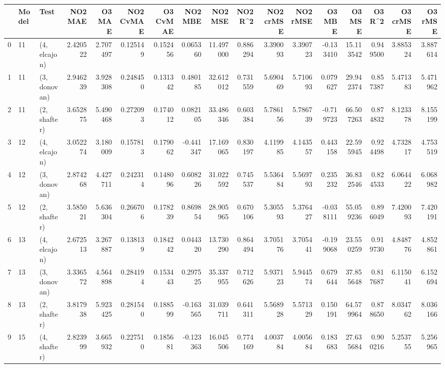 \begin{tabular}{lllrrrrrrrrrrrrrr}
\toprule
{} & Model &          Test &   NO2 MAE &    O3 MAE &  NO2 CvMAE &  O3 CvMAE &   NO2 MBE &    NO2 MSE &   NO2 R\textasciicircum2 &  NO2 crMSE &  NO2 rMSE &    O3 MBE &      O3 MSE &    O3 R\textasciicircum2 &  O3 crMSE &    O3 rMSE \\
\midrule
0  &    11 &  (4, elcajon) &  2.420522 &  2.707497 &   0.125149 &  0.152456 &  0.065360 &  11.497000 &  0.886294 &   3.390093 &  3.390723 & -0.133410 &   15.113542 &  0.949500 &  3.885324 &   3.887614 \\
1  &    11 &  (3, donovan) &  2.946239 &  3.928308 &   0.248450 &  0.131342 &  0.480185 &  32.612012 &  0.731559 &   5.690469 &  5.710693 &  0.079627 &   29.942374 &  0.857387 &  5.471383 &   5.471962 \\
2  &    11 &  (2, shafter) &  3.652875 &  5.490468 &   0.272093 &  0.174012 &  0.082105 &  33.486346 &  0.603384 &   5.786156 &  5.786739 & -0.719723 &   66.507263 &  0.874832 &  8.123378 &   8.155199 \\
3  &    12 &  (4, elcajon) &  3.052274 &  3.180009 &   0.157813 &  0.179062 & -0.441347 &  17.169065 &  0.830197 &   4.119985 &  4.143557 &  0.443158 &   22.595945 &  0.924498 &  4.732817 &   4.753519 \\
4  &    12 &  (3, donovan) &  2.874268 &  4.427711 &   0.242314 &  0.148096 &  0.608226 &  31.022592 &  0.745537 &   5.536484 &  5.569793 &  0.235232 &   36.832546 &  0.824533 &  6.064422 &   6.068982 \\
5  &    12 &  (2, shafter) &  3.585021 &  5.636304 &   0.266706 &  0.178239 &  0.869854 &  28.905965 &  0.670106 &   5.305593 &  5.376427 & -0.038111 &   55.059236 &  0.896049 &  7.420093 &   7.420191 \\
6  &    13 &  (4, elcajon) &  2.672513 &  3.267887 &   0.138139 &  0.184242 &  0.044320 &  13.730290 &  0.864494 &   3.705176 &  3.705441 & -0.199068 &   23.550259 &  0.919730 &  4.848776 &   4.852861 \\
7  &    13 &  (3, donovan) &  3.336572 &  4.564898 &   0.284194 &  0.153443 &  0.297525 &  35.337955 &  0.712626 &   5.937123 &  5.944574 &  0.679644 &   37.855648 &  0.817687 &  6.115041 &   6.152694 \\
8  &    13 &  (2, shafter) &  3.817938 &  5.923425 &   0.281540 &  0.188599 & -0.163565 &  31.039711 &  0.641311 &   5.568928 &  5.571329 &  0.150191 &   64.579964 &  0.878650 &  8.034762 &   8.036166 \\
9  &    15 &  (4, shafter) &  2.823999 &  3.665932 &   0.227510 &  0.185681 & -0.123363 &  16.045506 &  0.774169 &   4.003784 &  4.005684 &  0.183683 &   27.635684 &  0.900216 &  5.253755 &   5.256965 \\

\end{tabular}
